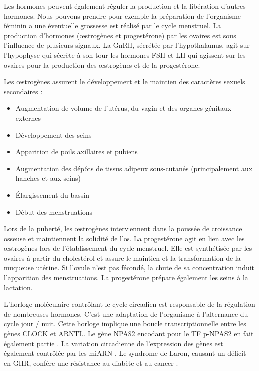 			Les hormones peuvent également réguler la production et la libération d'autres hormones.
			Nous pouvons prendre pour exemple la préparation de l'organisme féminin a une éventuelle grossesse est réalisé par le cycle menstruel.
			La production d'hormones ({\oe}strogènes et progestérone) par les ovaires est sous l'influence de plusieurs signaux.
			La GnRH, sécrétée par l'hypothalamus, agit sur l'hypophyse qui sécrète à son tour les hormones FSH et LH qui agissent sur les ovaires pour la production des {\oe}strogènes et de la progestérone.

			Les {\oe}strogènes assurent le développement et le maintien des caractères sexuels secondaires :
			\begin{itemize}
					\item   Augmentation de volume de l'utérus, du vagin et des organes génitaux externes
					\item   Développement des seins
					\item   Apparition de poils axillaires et pubiens
					\item   Augmentation des dépôts de tissus adipeux sous-cutanés (principalement aux hanches et aux seins)
					\item   Élargissement du bassin
					\item   Début des menstruations
			\end{itemize}

			Lors de la puberté, les {\oe}strogènes interviennent dans la poussée de croissance osseuse et maintiennent la solidité de l'os.
			La progestérone agit en lien avec les {\oe}strogènes lors de l'établissement du cycle menstruel.
			Elle est synthétisée par les ovaires à partir du cholestérol et assure le maintien et la transformation de la muqueuse utérine.
			Si l'ovule n'est pas fécondé, la chute de sa concentration induit l'apparition des menstruations.
			La progestérone prépare également les seins à la lactation.

\pagebreak

			L'horloge moléculaire contrôlant le cycle circadien est responsable de la régulation de nombreuses hormones.
			C'est une adaptation de l'organisme à l'alternance du cycle jour / nuit.
			Cette horloge implique une boucle transcriptionnelle entre les gènes \acs{CLOCK} et \acs{ARNTL}.
			Le gène \acs{NPAS2} encodant pour le \acs{TF} \acs{p-NPAS2} en fait également partie \citep{Koike2012}.
			La variation circadienne de l'expression des gènes est également contrôlée par les \ac{miARN} \citep{Mehta2012}.
			Le syndrome de Laron, causant un déficit en \acs{GHR}, confère une résistance au diabète et au cancer \citep{GuevaraAguirre2011}.

